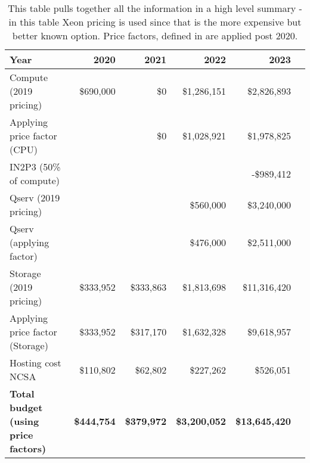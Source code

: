 \tiny \begin{longtable} { |p{}  |r  |r  |r  |r  |r |} 
\caption{This table pulls together all the information in a high level summary - in this table Xeon pricing is used since that is the more expensive but better known option. Price factors, defined in  are applied post 2020.
 \label{tab:Summary}}\\ 
\hline 
\textbf{Year}&\textbf{2020}&\textbf{2021}&\textbf{2022}&\textbf{2023} \\ \hline
{Compute (2019 pricing)}&{\$690,000}&{\$0}&{\$1,286,151}&{\$2,826,893} \\ \hline
{Applying price factor (CPU)}&{}&{\$0}&{\$1,028,921}&{\$1,978,825} \\ \hline
{IN2P3 (50\% of compute)}&{}&{}&{}&{-\$989,412} \\ \hline
{Qserv (2019 pricing)}&{}&{}&{\$560,000}&{\$3,240,000} \\ \hline
{Qserv (applying factor)}&{}&{}&{\$476,000}&{\$2,511,000} \\ \hline
{Storage (2019 pricing)}&{\$333,952}&{\$333,863}&{\$1,813,698}&{\$11,316,420} \\ \hline
{Applying price factor (Storage)}&{\$333,952}&{\$317,170}&{\$1,632,328}&{\$9,618,957} \\ \hline
{Hosting cost NCSA
}&{\$110,802}&{\$62,802}&{\$227,262}&{\$526,051} \\ \hline
\textbf{Total budget (using price factors)}&\textbf{\$444,754}&\textbf{\$379,972}&\textbf{\$3,200,052}&\textbf{\$13,645,420} \\ \hline
\end{longtable} \normalsize
